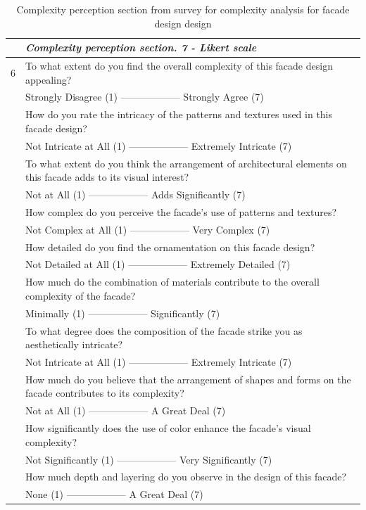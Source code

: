 \begin{table}[htb]
    \centering
    \footnotesize
    \caption{Complexity perception section  from survey for complexity analysis for facade design design}
    \label{tab:ComplexitySurvey}
    \begin{tabularx}{\linewidth}{p{0.125cm}X}
        \toprule
        & \textit{Complexity perception section. 7 - Likert scale} \\
        \midrule
        6 & To what extent do you find the overall complexity of this facade design appealing?\\
        & Strongly Disagree (1) —————— Strongly Agree (7) \\
        \addlinespace
        7 & How do you rate the intricacy of the patterns and textures used in this facade design? \\
        & Not Intricate at All (1) —————— Extremely Intricate (7)\\
        \addlinespace
        8 & To what extent do you think the arrangement of architectural elements on this facade adds to its visual interest? \\
        & Not at All (1) —————— Adds Significantly (7) \\
        \addlinespace
        9 & How complex do you perceive the facade's use of patterns and textures? \\
        & Not Complex at All (1) —————— Very Complex (7) \\
        \addlinespace
        10 & How detailed do you find the ornamentation on this facade design? \\
        & Not Detailed at All (1) —————— Extremely Detailed (7) \\
        \addlinespace
        11 & How much do the combination of materials contribute to the overall complexity of the facade? \\
        & Minimally (1) —————— Significantly (7) \\
        \addlinespace
        12 & To what degree does the composition of the facade strike you as aesthetically intricate? \\
        & Not Intricate at All (1) —————— Extremely Intricate (7) \\
        \addlinespace
        13 & How much do you believe that the arrangement of shapes and forms on the facade contributes to its complexity? \\
        & Not at All (1) —————— A Great Deal (7) \\
        \addlinespace
        14 & How significantly does the use of color enhance the facade's visual complexity? \\
        & Not Significantly (1) —————— Very Significantly (7) \\
        \addlinespace
        15 & How much depth and layering do you observe in the design of this facade? \\
        & None (1) —————— A Great Deal (7) \\
        \bottomrule
    \end{tabularx}
\end{table}

